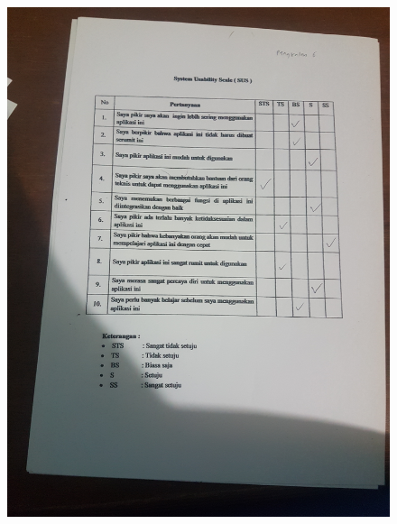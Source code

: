 \begin{figure}[H]
	\center
	\includegraphics [width = 17cm,angle=-90]{gambar/pengujian/pangkalan6}
\end{figure}
